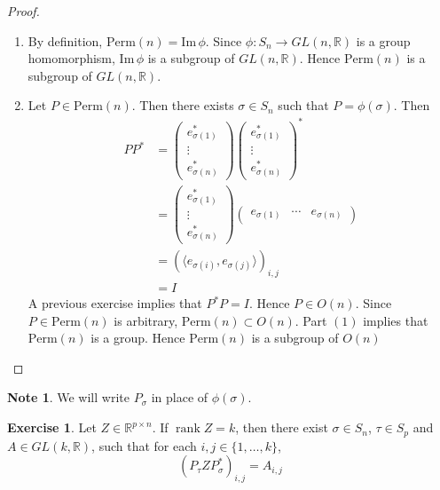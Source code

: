\documentclass{book}
\theoremstyle{definition}
\newtheorem{note}[definition]{Note}
\newtheorem{ex}[definition]{Exercise}
\newcommand{\sig}{\sigma}
\newcommand{\R}{\mathbb{R}}
\DeclareMathOperator{\rnk}{rank}
\DeclareMathOperator*{\0}{\mbf{0}}
\DeclareMathOperator*{\1}{\mbf{1}}
\renewcommand{\r}{\rangle}
\renewcommand{\l}{\langle}
\renewcommand{\Im}{\text{Im} \,}
\newcommand{\Perm}{\text{Perm}}
\begin{document}
	\begin{proof}\
		\begin{enumerate}
			\item By definition, $\Perm(n) = \Im \phi$. Since $\phi: S_n \rightarrow GL(n, \R)$ is a group homomorphism, $\Im \phi$ is a subgroup of $GL(n, \R)$. Hence $\Perm(n)$ is a subgroup of $GL(n, \R)$.
			\item Let $P \in \Perm(n)$. Then there exists $\sig \in S_n$ such that $P = \phi(\sig)$. Then 
			\begin{align*}
				PP^*
				& = 
				\begin{pmatrix}
					e_{\sig(1)}^* \\
					\vdots \\
					e_{\sig(n)}^*
				\end{pmatrix} 
				\begin{pmatrix}
					e_{\sig(1)}^* \\
					\vdots \\
					e_{\sig(n)}^*
				\end{pmatrix} ^* \\
				& = \begin{pmatrix}
					e_{\sig(1)}^* \\
					\vdots \\
					e_{\sig(n)}^*
				\end{pmatrix} 
				\begin{pmatrix}
					e_{\sig(1)} & \cdots & e_{\sig(n)}
				\end{pmatrix} \\
				& = (\l e_{\sig(i)}, e_{\sig(j)} \r)_{i,j} \\
				& = I
			\end{align*}
			A previous exercise implies that $P^*P = I$. Hence $P \in O(n)$. Since $P \in \Perm(n)$ is arbitrary, $\Perm(n) \subset O(n)$. Part $(1)$ implies that $\Perm(n)$ is a group. Hence $\Perm(n)$ is a subgroup of $O(n)$
		\end{enumerate}
	\end{proof}

	\begin{note}
		We will write $P_{\sig}$ in place of $\phi(\sig)$.
	\end{note}

	\begin{ex}
		Let $Z \in \R^{p \times n}$. If $\rnk Z = k$, then there exist $\sig \in S_n$, $\tau \in S_p$ and $A \in GL(k, \R)$, such that for each $i,j \in \{1, \ldots, k\}$,
		$$(P_{\tau} Z P^*_{\sig})_{i, j} = A_{i,j} $$
	\end{ex}
\end{document}
